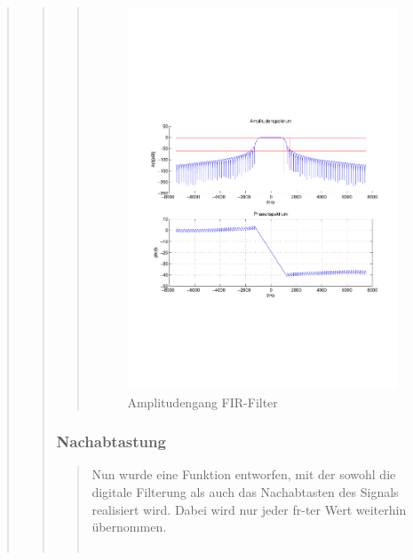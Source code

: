\begin{quote}
\begin{quote}
\begin{quote}
		    \begin{figure}[H]
            \centering
                \includegraphics[scale=0.7, trim = 1cm 6cm 1cm 8cm, clip]{./Bilder/Amplitudengang_FIRFilter}
                    \caption{Amplitudengang FIR-Filter}
            \end{figure}      
		            
		  \end{quote}          
		            
		  \subsubsection{Nachabtastung}
		  \begin{quote}
		            
		    Nun wurde eine Funktion entworfen, mit der sowohl die digitale Filterung als
		    auch das Nachabtasten des Signals realisiert wird. Dabei wird nur jeder
		    fr-ter Wert weiterhin übernommen.\\
		     \\
		 

\end{quote}
\end{quote}
\end{quote}
